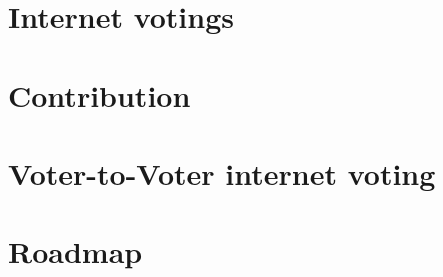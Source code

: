 \documentclass{beamer}
\begin{document}
\section{Internet votings}

\section{Contribution}

\section{Voter-to-Voter internet voting}

\section{Roadmap}

\pglastframe


\end{document}
